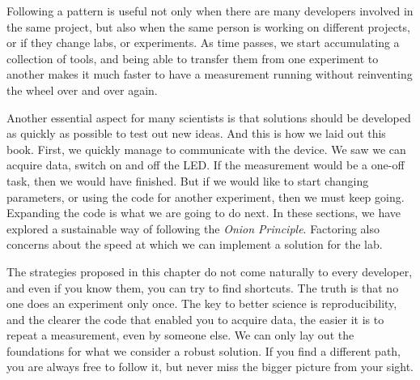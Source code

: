 Following a pattern is useful not only when there are many developers involved in the same project, but also when the same person is working on different projects, or if they change labs, or experiments. As time passes, we start accumulating a collection of tools, and being able to transfer them from one experiment to another makes it much faster to have a measurement running without reinventing the wheel over and over again.

Another essential aspect for many scientists is that solutions should be developed as quickly as possible to test out new ideas. And this is how we laid out this book. First, we quickly manage to communicate with the device. We saw we can acquire data, switch on and off the LED. If the measurement would be a one-off task, then we would have finished. But if we would like to start changing parameters, or using the code for another experiment, then we must keep going. Expanding the code is what we are going to do next. In these sections, we have explored a sustainable way of following the \emph{Onion Principle}. Factoring also concerns about the speed at which we can implement a solution for the lab.

The strategies proposed in this chapter do not come naturally to every developer, and even if you know them, you can try to find shortcuts. The truth is that no one does an experiment only once. The key to better science is reproducibility, and the clearer the code that enabled you to acquire data, the easier it is to repeat a measurement, even by someone else. We can only lay out the foundations for what we consider a robust solution. If you find a different path, you are always free to follow it, but never miss the bigger picture from your sight.
